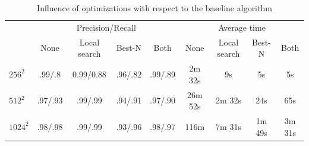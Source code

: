 \documentclass{llncs}
\begin{document}
\begin{table}
\centering
\caption{Influence of optimizations with respect to the baseline algorithm}
\label{table:optimize}
\begin{tabular}{lcccccccc}
\toprule
 & \multicolumn{4}{c}{Precision/Recall} & \multicolumn{4}{c}{Average time}\\
 \cmidrule(r){2-5} \cmidrule(r){6-9} 
 & None & Local search & Best-N & Both & None & Local search & Best-N & Both \\
\midrule
 $256^2$   & .99/.8 & 0.99/0.88 & .96/.82 & .99/.89 & 2m 32s & 9s & 5s & 5s \\
 $512^2$   & .97/.93 & .99/.99 & .94/.91 & .97/.90 & 26m 52s & 2m 32s & 24s & 65s \\
 $1024^2$ & .98/.98 & .99/.99 & .93/.96 & .98/.97 & 116m & 7m 31s & 1m 49s & 3m 31s \\
\bottomrule
\end{tabular}
\end{table}
\end{document}
